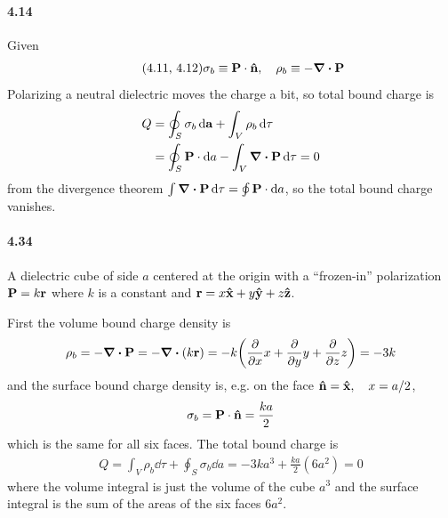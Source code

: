 \documentclass[../main.tex]{subfiles}
\begin{document}
\newpage
\paragraph{4.14} Given
\begin{align*} \tag{4.11, 4.12} \label{eq:11_12}
    \sigma_b \equiv \vb P \cdot \vu n, \quad \rho_b \equiv -\div \vb P
\end{align*}
Polarizing a neutral dielectric moves the charge a bit, so total bound charge is
\begin{align*}
    Q &= \oint_S \sigma_b \dd{\vb a} + \int_V \rho_b \dd{\tau} \\
    &= \oint_S \vb P \cdot \dd{a} - \int_V \div \vb P \dd{\tau} = 0
\end{align*}
from the divergence theorem $\int \div \vb P \dd{\tau} = \oint \vb P \cdot \dd{a}$, so the total bound charge vanishes.

\newpage
\paragraph{4.34} A dielectric cube of side $a$ centered at the origin with a ``frozen-in'' polarization $\vb P = k \vb r$ where $k$ is a constant
and $\vb r = x \vu x + y \vu y + z \vu z$.

First the volume bound charge density is
\begin{align*}
    \rho_b = -\div \vb P = -\div (k \vb r) = -k \qt(\pdv{x} x + \pdv{y} y + \pdv{z} z) = -3k
\end{align*}
and the surface bound charge density is, e.g. on the face $\vu n = \vu x, \quad x = a/2$,
\begin{align*}
    \sigma_b = \vb P \cdot \vu n = \frac{k a}{2}
\end{align*}
which is the same for all six faces. The total bound charge is 
\begin{align*}
    Q = \int_V \rho_b \dd{\tau} + \oint_S \sigma_b \dd{a} = -3k a^3 + \frac{k a}{2} (6a^2) = 0
\end{align*}
where the volume integral is just the volume of the cube $a^3$ and the surface integral is the sum of the areas of the six faces $6a^2$.
\end{document}
